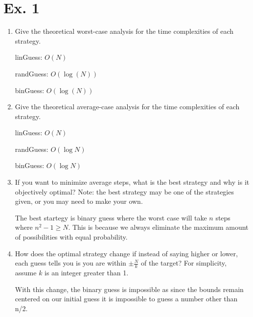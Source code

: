 \documentclass{article}
\begin{document}
\section{Ex. 1}
\begin{enumerate}
    \item Give the theoretical worst-case analysis for the time complexities of each strategy.
    
    linGuess: $O(N)$
    
    randGuess: $O(\log(N))$
    
    binGuess: $O(\log(N))$
    
    \item Give the theoretical average-case analysis for the time complexities of each strategy.
    
    linGuess: $O(N)$

    randGuess: $O(\log N)$

    binGuess: $O(\log N)$
    
    \item If you want to minimize average steps, what is the best strategy and why is it objectively optimal? Note: the best strategy may be one of the strategies given, or you may need to make your own.
    
    The best startegy is binary guess where the worst case will take $n$ steps where $n^2-1 \ge N$. This is because we always eliminate the maximum amount of possibilities with equal probability.

    \item How does the optimal strategy change if instead of saying higher or lower, each guess tells you is you are within $\pm \frac{N}{k}$ of the target? For simplicity, assume $k$ is an integer greater than 1.

    With this change, the binary guess is impossible as since the bounds remain centered on our initial guess it is impossible to guess a number other than n/2.

\end{enumerate}
\end{document}

